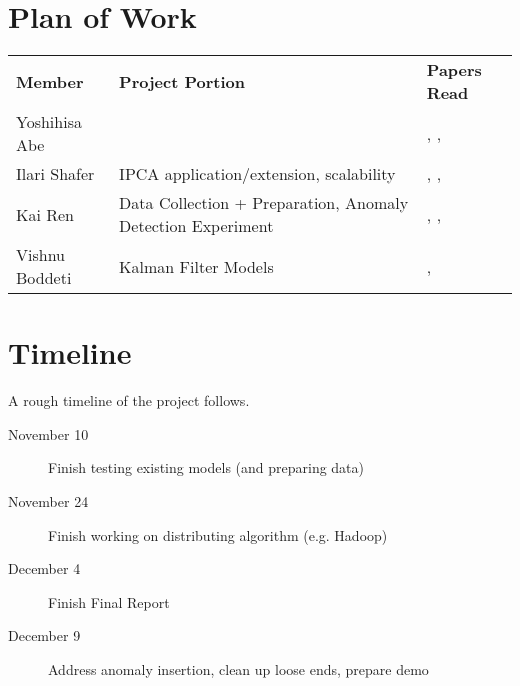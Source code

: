 \section{Plan of Work}
\begin{tabular}{lll}
\bf Member & \bf Project Portion & \bf Papers Read \\
Yoshihisa Abe & & \cite{Zhu2002}, \cite{Zhu2003}, \cite{Sakurai2011} \\
Ilari Shafer & IPCA application/extension, scalability & \cite{Li2009}, \cite{Gmach2007}, \cite{Lavrenko2000} \\
Kai Ren & Data Collection + Preparation, Anomaly Detection Experiment &  \cite{xu2009}, \cite{xu2010}, \cite{nguyen2011} \\
Vishnu Boddeti & Kalman Filter Models & \cite{papadimitriou2005streaming}, \cite{roweis1999unifying}
\end{tabular}

\section{Timeline}
\label{sec:timeline}
A rough timeline of the project follows.
\begin{description}
\item[November 10] Finish testing existing models (and preparing data)
\item[November 24] Finish working on distributing algorithm (e.g. Hadoop)
\item[December 4] Finish Final Report
\item[December 9] Address anomaly insertion, clean up loose ends, prepare demo
\end{description}



\newpage
{}


